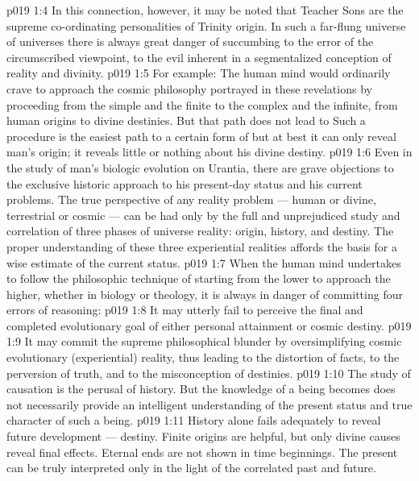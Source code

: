 \vs p019 1:4 In this connection, however, it may be noted that Teacher Sons are the supreme co\hyp{}ordinating personalities of Trinity origin. In such a far\hyp{}flung universe of universes there is always great danger of succumbing to the error of the circumscribed viewpoint, to the evil inherent in a segmentalized conception of reality and divinity.
\vs p019 1:5 For example: The human mind would ordinarily crave to approach the cosmic philosophy portrayed in these revelations by proceeding from the simple and the finite to the complex and the infinite, from human origins to divine destinies. But that path does not lead to  Such a procedure is the easiest path to a certain form of  but at best it can only reveal man’s origin; it reveals little or nothing about his divine destiny.
\vs p019 1:6 Even in the study of man’s biologic evolution on Urantia, there are grave objections to the exclusive historic approach to his present\hyp{}day status and his current problems. The true perspective of any reality problem --- human or divine, terrestrial or cosmic --- can be had only by the full and unprejudiced study and correlation of three phases of universe reality: origin, history, and destiny. The proper understanding of these three experiential realities affords the basis for a wise estimate of the current status.
\vs p019 1:7 \pc When the human mind undertakes to follow the philosophic technique of starting from the lower to approach the higher, whether in biology or theology, it is always in danger of committing four errors of reasoning:
\vs p019 1:8 \bibnobreakspace It may utterly fail to perceive the final and completed evolutionary goal of either personal attainment or cosmic destiny.
\vs p019 1:9 \bibnobreakspace It may commit the supreme philosophical blunder by oversimplifying cosmic evolutionary (experiential) reality, thus leading to the distortion of facts, to the perversion of truth, and to the misconception of destinies.
\vs p019 1:10 \bibnobreakspace The study of causation is the perusal of history. But the knowledge of  a being becomes does not necessarily provide an intelligent understanding of the present status and true character of such a being.
\vs p019 1:11 \bibnobreakspace History alone fails adequately to reveal future development --- destiny. Finite origins are helpful, but only divine causes reveal final effects. Eternal ends are not shown in time beginnings. The present can be truly interpreted only in the light of the correlated past and future.
